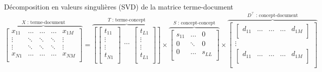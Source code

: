 \documentclass{KodeBook}
\begin{document}
\begin{block}{Décomposition en valeurs singulières (SVD) de la matrice terme-document}
	\scriptsize\bfseries
	\[
	\overbrace{
		\begin{bmatrix}
		x_{11} & \ldots & \ldots & \ldots & x_{1M} \\ 
		\vdots & \ddots & \ddots & \ddots &\vdots \\
		\vdots & \ddots & \ddots & \ddots &\vdots \\
		x_{N1} & \ldots & \ldots & \ldots & x_{NM} \\ 
		\end{bmatrix}
	}^{X \text{ : terme-document}}
	=
	\overbrace{
		\left[
		\begin{bmatrix}
		t_{11} \\ 
		\vdots \\
		\vdots \\
		t_{N1} \\ 
		\end{bmatrix}
		\begin{matrix}
		\ldots \\ 
		\end{matrix}
		\begin{bmatrix}
		t_{L1} \\ 
		\vdots \\
		\vdots \\
		t_{L1} \\ 
		\end{bmatrix}
		\right]
	}^{T \text{ : terme-concept}}
	\times 
	\overbrace{
		\begin{bmatrix}
		s_{11} & \ldots & 0 \\
		0 & \ddots & 0 \\
		0 & \ldots & s_{LL} \\
		\end{bmatrix}
	}^{S \text{ : concept-concept}}
	\times 
	\overbrace{
		\begin{bmatrix}
		\begin{bmatrix}
		d_{11} & \ldots & \ldots & \ldots & d_{1M} \\
		\end{bmatrix}\\
		\vdots \\
		\begin{bmatrix}
		d_{11} & \ldots & \ldots & \ldots & d_{1M} \\
		\end{bmatrix}\\
		\end{bmatrix}
	}^{D^\top \text{ : concept-document}}
	\]
	
\end{block}
\end{document}
